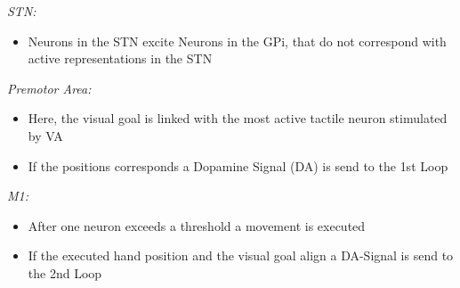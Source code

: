 \documentclass[portrait,final,a0paper,fontscale=0.33]{baposter}
\begin{document}
\begin{poster}
{\begin{adjustbox}{minipage=0.95\textwidth, margin=5pt, center}
\begin{multicols}{2}
	\textit{STN:}
	\begin{itemize}[itemsep=0pt]
		\item Neurons in the STN excite Neurons in the GPi, that do not correspond with active representations in the STN
	\end{itemize}
	
	\textit{Premotor Area:}
	\begin{itemize}[itemsep=0pt]
		\item Here, the visual goal is linked with the most active tactile neuron stimulated by VA
		\item If the positions corresponds a Dopamine Signal (DA) is send to the \textcolor{loop1}{1st Loop}
	\end{itemize}
	\textit{M1:}
	\begin{itemize}[itemsep=0pt]
		\item After one neuron exceeds a threshold a movement is executed
		\item If the executed hand position and the visual goal align a DA-Signal is send to the \textcolor{loop2}{2nd Loop}
	\end{itemize}
	
	\end{multicols}
	\end{adjustbox}
}

\end{poster}
\end{document}
